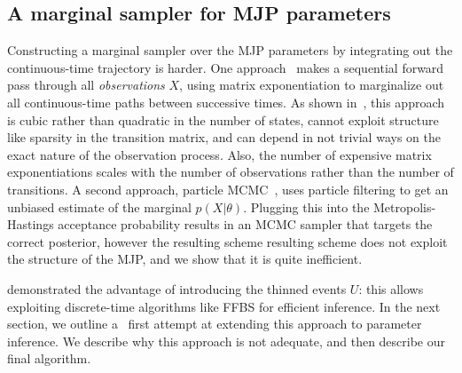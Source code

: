 \subsection{A marginal sampler for MJP parameters} 
Constructing a marginal sampler over the MJP parameters by
integrating out the continuous-time trajectory is harder.
One approach~\cite{FearnSher2006} makes a sequential 
forward pass through all {\em observations} $X$, using matrix exponentiation
to marginalize out all
continuous-time paths between successive times. As
shown in~\cite{RaoTeh13}, this approach is cubic rather than 
quadratic in the 
number of states, cannot exploit structure like sparsity in the 
transition matrix, and can depend in not trivial ways on the exact 
nature of the observation process.
Also, the number of expensive matrix exponentiations scales
with the number of observations rather than the number of transitions.
%
%
A second approach, particle MCMC~\cite{Andrieu10}, uses 
particle filtering to get an unbiased estimate of the marginal 
$p(X|\theta)$. Plugging this into the Metropolis-Hastings 
acceptance probability results in an MCMC sampler that targets the 
correct posterior, however %
the resulting scheme resulting scheme does not exploit the structure 
of the MJP, and we show that it is quite inefficient.

\cite{RaoTeh13, RaoTeh12} demonstrated the advantage of
introducing the thinned events $U$: this allows exploiting discrete-time 
algorithms like FFBS for efficient inference.
In the next section, we outline a \naive\  first attempt at extending this 
approach to parameter inference.
We describe why this approach is not adequate, and then describe our
final algorithm. %
